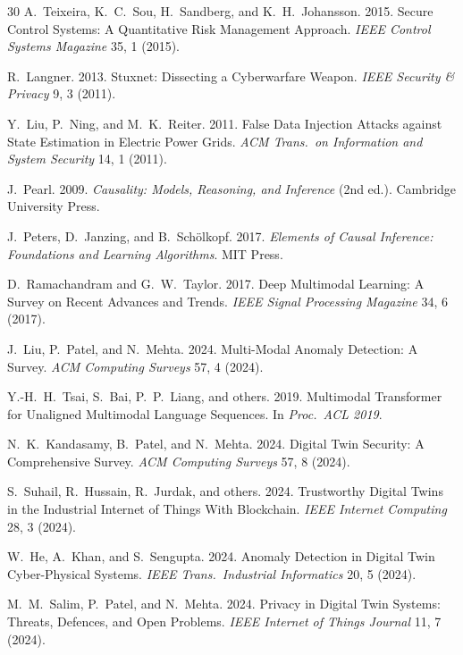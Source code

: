 \documentclass[sigconf,nonacm]{acmart}
\begin{document}
\begin{thebibliography}{30}
A.~Teixeira, K.~C.~Sou, H.~Sandberg, and K.~H.~Johansson. 2015.
Secure Control Systems: A Quantitative Risk Management Approach.
\textit{IEEE Control Systems Magazine} 35, 1 (2015).

R.~Langner. 2013. Stuxnet: Dissecting a Cyberwarfare Weapon.
\textit{IEEE Security \& Privacy} 9, 3 (2011).

Y.~Liu, P.~Ning, and M.~K.~Reiter. 2011. False Data Injection
Attacks against State Estimation in Electric Power Grids.
\textit{ACM Trans.\ on Information and System Security} 14, 1
(2011).

J.~Pearl. 2009. \textit{Causality: Models, Reasoning, and Inference}
(2nd ed.). Cambridge University Press.

J.~Peters, D.~Janzing, and B.~Sch\"olkopf. 2017. \textit{Elements
of Causal Inference: Foundations and Learning Algorithms}.
MIT Press.

D.~Ramachandram and G.~W.~Taylor. 2017. Deep Multimodal Learning:
A Survey on Recent Advances and Trends.
\textit{IEEE Signal Processing Magazine} 34, 6 (2017).

J.~Liu, P.~Patel, and N.~Mehta. 2024. Multi-Modal Anomaly
Detection: A Survey. \textit{ACM Computing Surveys} 57, 4 (2024).

Y.-H.~H.~Tsai, S.~Bai, P.~P.~Liang, and others. 2019. Multimodal
Transformer for Unaligned Multimodal Language Sequences.
In \textit{Proc.\ ACL 2019}.

N.~K.~Kandasamy, B.~Patel, and N.~Mehta. 2024. Digital Twin
Security: A Comprehensive Survey.
\textit{ACM Computing Surveys} 57, 8 (2024).

S.~Suhail, R.~Hussain, R.~Jurdak, and others. 2024. Trustworthy
Digital Twins in the Industrial Internet of Things With
Blockchain. \textit{IEEE Internet Computing} 28, 3 (2024).

W.~He, A.~Khan, and S.~Sengupta. 2024. Anomaly Detection in
Digital Twin Cyber-Physical Systems.
\textit{IEEE Trans.\ Industrial Informatics} 20, 5 (2024).

M.~M.~Salim, P.~Patel, and N.~Mehta. 2024. Privacy in Digital
Twin Systems: Threats, Defences, and Open Problems.
\textit{IEEE Internet of Things Journal} 11, 7 (2024).


\end{thebibliography}
\end{document}
